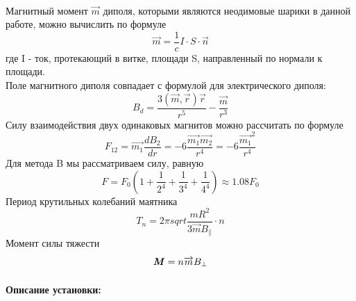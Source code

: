 \documentclass[a4paper,12pt]{article}
\begin{document}
\paragraph{}
Магнитный момент $\overrightarrow{m}$ диполя, которыми являются неодимовые шарики в данной работе, можно вычислить по формуле 
\begin{equation}
\overrightarrow{m} = \frac{1}{c}I\cdot S \cdot \overrightarrow{n} 
\end{equation}
где I - ток, протекающий в витке, площади S, направленный по нормали к площади.\\
Поле магнитного диполя совпадает с формулой для электрического диполя:
\begin{equation}
B_{d} = \frac{3(\overrightarrow{m},\overrightarrow{r})\overrightarrow{r}}{r^5} -\frac{\overrightarrow{m}}{r^3}
\end{equation}
Силу взаимодействия двух одинаковых магнитов можно рассчитать по формуле
\begin{equation}
F_{12} = \overrightarrow{m_1}\frac{dB_2}{dr} = -6\frac{\overrightarrow{m_1} \overrightarrow{m_2}}{r^4} = -6\frac{\overrightarrow{m_1}^2}{r^4}
\end{equation}
Для метода B мы рассматриваем силу, равную
\begin{equation}
F=F_0(1+\frac{1}{2^4}+\frac{1}{3^4}+\frac{1}{4^4})\approx 1.08F_0
\end{equation}
Период крутильных колебаний маятника
\begin{equation}
T_{n}=2\pi sqrt{\frac{mR^2}{3\overrightarrow{m}B_{\parallel}}}\cdot n
\end{equation}
Момент силы тяжести
\begin{equation}
\textbf{\emph{M}} = n\overrightarrow{m}B_{\perp}
\end{equation}
\paragraph{}

\paragraph{Описание установки:}
\end{document}

